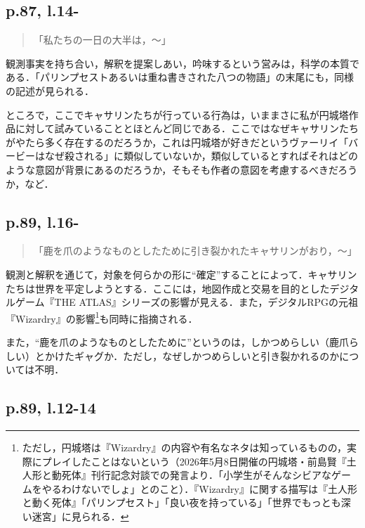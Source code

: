 \documentclass[10pt, a5paper, twoside]{ltjsarticle}
\begin{document}
        \subsection{p.87, l.14-}

            \begin{quote}
                「私たちの一日の大半は，〜」
            \end{quote}

            観測事実を持ち合い，解釈を提案しあい，吟味するという営みは，科学の本質である．「パリンプセストあるいは重ね書きされた八つの物語」の末尾にも，同様の記述が見られる．

            ところで，ここでキャサリンたちが行っている行為は，いままさに私が円城塔作品に対して試みていることとほとんど同じである．ここではなぜキャサリンたちがやたら多く存在するのだろうか，これは円城塔が好きだというヴァーリイ「バービーはなぜ殺される」に類似していないか，類似しているとすればそれはどのような意図が背景にあるのだろうか，そもそも作者の意図を考慮するべきだろうか，など．

        \subsection{p.89, l.16-}

            \begin{quote}
                「鹿を爪のようなものとしたために引き裂かれたキャサリンがおり，〜」
            \end{quote}

            観測と解釈を通じて，対象を何らかの形に“確定”することによって．キャサリンたちは世界を平定しようとする．ここには，地図作成と交易を目的としたデジタルゲーム『THE ATLAS』シリーズの影響が見える．また，デジタルRPGの元祖『Wizardry』の影響\footnote{ただし，円城塔は『Wizardry』の内容や有名なネタは知っているものの，実際にプレイしたことはないという（2026年5月8日開催の円城塔・前島賢『土人形と動死体』刊行記念対談での発言より．「小学生がそんなシビアなゲームをやるわけないでしょ」とのこと）．『Wizardry』に関する描写は『土人形と動く死体』「パリンプセスト」「良い夜を持っている」「世界でもっとも深い迷宮」に見られる．}も同時に指摘される．

            また，“鹿を爪のようなものとしたために”というのは，しかつめらしい（鹿爪らしい）とかけたギャグか．ただし，なぜしかつめらしいと引き裂かれるのかについては不明．

        \subsection{p.89, l.12-14}\label{duck}
\end{document}
